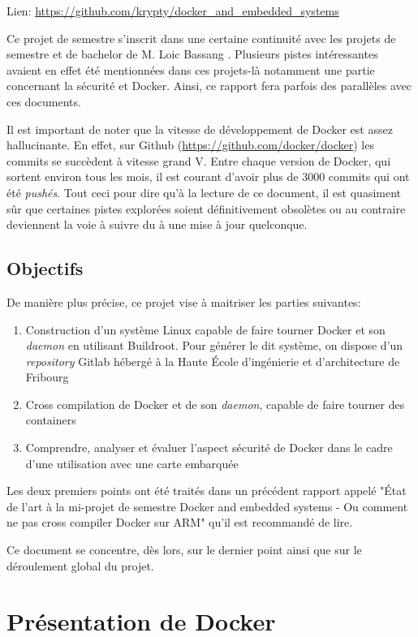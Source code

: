 \documentclass[11pt,a4paper,oneside]{report}
\newcommand{\school}{Haute École d'ingénierie et d'architecture de Fribourg}
\newcommand{\oldreportname}{État de l’art à la mi-projet de semestre Docker and embedded systems - Ou comment ne pas cross compiler Docker sur ARM}
\begin{document}
Lien: \url{https://github.com/krypty/docker_and_embedded_systems}

Ce projet de semestre s'inscrit dans une certaine continuité avec les projets de semestre et de bachelor de M. Loic Bassang \cite{bassang_bachelor}. Plusieurs pistes intéressantes avaient en effet été mentionnées dans ces projets-là notamment une partie concernant la sécurité et Docker. Ainsi, ce rapport fera parfois des parallèles avec ces documents.

Il est important de noter que la vitesse de développement de Docker est assez hallucinante. En effet, sur Github (\url{https://github.com/docker/docker}) les commits se succèdent à vitesse grand V. Entre chaque version de Docker, qui sortent environ tous les mois, il est courant d'avoir plus de 3000 commits qui ont été \emph{pushés}. Tout ceci pour dire qu'à la lecture de ce document, il est quasiment sûr que certaines pistes explorées soient définitivement obsolètes ou au contraire deviennent la voie à suivre du à une mise à jour quelconque.


\section{Objectifs}

De manière plus précise, ce projet vise à maitriser les parties suivantes:

\begin{enumerate}
  \item Construction d'un système Linux capable de faire tourner Docker et son \emph{daemon} en utilisant Buildroot. Pour générer le dit système, on dispose d'un \emph{repository} Gitlab hébergé à la \school

  \item Cross compilation de Docker et de son \emph{daemon}, capable de faire tourner des containers
  
  \item Comprendre, analyser et évaluer l'aspect sécurité de Docker dans le cadre d'une utilisation avec une carte embarquée
\end{enumerate}

Les deux premiers points ont été traités dans un précédent rapport appelé "\oldreportname" qu'il est recommandé de lire.

Ce document se concentre, dès lors, sur le dernier point ainsi que sur le déroulement global du projet.


\chapter{Présentation de Docker}
\end{document}
